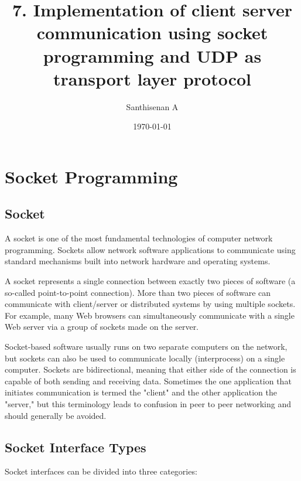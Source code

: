 \documentclass[a4paper,12pt]{article}
\begin{document}
    
    
        \title{7. Implementation of client server communication using socket programming and UDP as transport layer protocol}
        \author{Santhisenan A}
        \date{\today}
        \maketitle
    
    \section{Socket Programming}
    
    \subsection{Socket}
    A socket is one of the most fundamental technologies of computer network programming. Sockets allow network software applications to communicate using standard mechanisms built into network hardware and operating systems.
    
    
    A socket represents a single connection between exactly two pieces of software (a so-called point-to-point connection). More than two pieces of software can communicate with client/server or distributed systems by using multiple sockets. For example, many Web browsers can simultaneously communicate with a single Web server via a group of sockets made on the server.
    
    
    Socket-based software usually runs on two separate computers on the network, but sockets can also be used to communicate locally (interprocess) on a single computer. Sockets are bidirectional, meaning that either side of the connection is capable of both sending and receiving data. Sometimes the one application that initiates communication is termed the "client" and the other application the "server," but this terminology leads to confusion in peer to peer networking and should generally be avoided.
    
    \subsection{Socket Interface Types}
    
    Socket interfaces can be divided into three categories:
    
\end{document}
